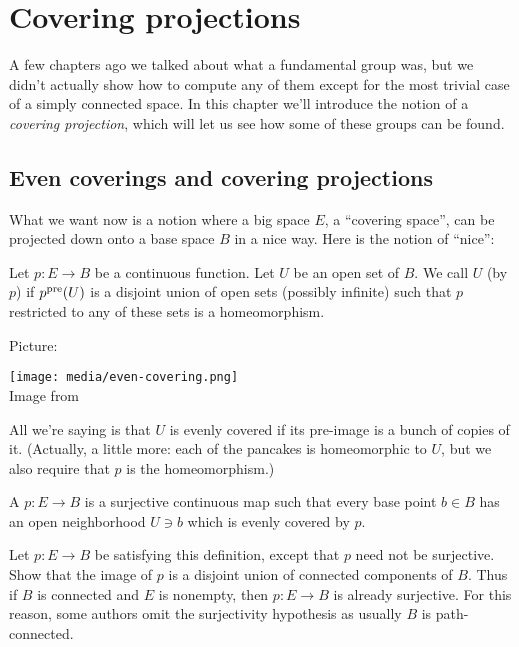 \chapter{Covering projections}
\label{ch:covering_projections}
A few chapters ago we talked about what a fundamental group was,
but we didn't actually show how to compute any of them
except for the most trivial case of a simply connected space.
In this chapter we'll introduce the notion of a \emph{covering projection},
which will let us see how some of these groups can be found.

\section{Even coverings and covering projections}
What we want now is a notion where a big space $E$, a ``covering space'',
can be projected down onto a base space $B$ in a nice way.
Here is the notion of ``nice'':
\begin{definition}
	Let $p \colon E \to B$ be a continuous function.
	Let $U$ be an open set of $B$.
	We call $U$  (by $p$) if $p^{\text{pre}}(U)$ is a disjoint union of open sets (possibly infinite) such that $p$ restricted to any of these sets is a homeomorphism.
\end{definition}
Picture:
\begin{center}
	\texttt{[image: media/even-covering.png]}
	\\ \scriptsize Image from \cite{img:even_covering}
\end{center}
All we're saying is that $U$ is evenly covered if its pre-image
is a bunch of copies of it. (Actually, a little more: each of the pancakes is homeomorphic to $U$, but we also require that $p$ is the homeomorphism.)

\begin{definition}
	A  $p \colon E \to B$
	is a surjective continuous map such that every base point $b \in B$
	has an open neighborhood $U \ni b$ which is evenly covered by $p$.
\end{definition}
\begin{exercise}
	Let $p \colon E \to B$ be satisfying this definition,
	except that $p$ need not be surjective.
	Show that the image of $p$ is a disjoint union of connected components of $B$.
	Thus if $B$ is connected and $E$ is nonempty,
	then $p \colon E \to B$ is already surjective.
	For this reason, some authors omit the surjectivity hypothesis
	as usually $B$ is path-connected.
\end{exercise}

